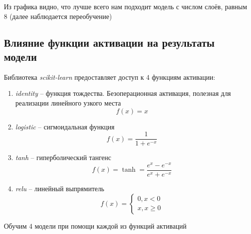 \documentclass[11pt]{article}
\begin{document}
    Из графика видно, что лучше всего нам подходит модель с числом слоёв,
равным 8 (далее наблюдается переобучение)

    \hypertarget{ux432ux43bux438ux44fux43dux438ux435-ux444ux443ux43dux43aux446ux438ux438-ux430ux43aux442ux438ux432ux430ux446ux438ux438-ux43dux430-ux440ux435ux437ux443ux43bux44cux442ux430ux442ux44b-ux43cux43eux434ux435ux43bux438}{%
\subsection{Влияние функции активации на результаты
модели}\label{ux432ux43bux438ux44fux43dux438ux435-ux444ux443ux43dux43aux446ux438ux438-ux430ux43aux442ux438ux432ux430ux446ux438ux438-ux43dux430-ux440ux435ux437ux443ux43bux44cux442ux430ux442ux44b-ux43cux43eux434ux435ux43bux438}}

Библиотека \textit{scikit-learn} предоставляет доступ к 4 функциям
активации:

\begin{enumerate}
    \item \textit{identity} -- функция тождества. Безоперационная активация, полезная для реализации линейного узкого места
        \begin{equation}
            f(x) = x
        \end{equation}
    \item \textit{logistic} -- сигмоидальная функция
        \begin{equation}
            f(x) = \frac{1}{1+e^{-x}}
        \end{equation}
    \item \textit{tanh} -- гиперболический тангенс
        \begin{equation}
            f(x) = \tanh = \frac{e^{x}-e^{-x}}{e^{x}+e^{-x}}
        \end{equation}
    \item \textit{relu} -- линейный выпрямитель
        \begin{equation}
            f(x) = 
            \begin{cases}
                0, x<0\\
                x, x\geqslant 0
            \end{cases}
        \end{equation}
\end{enumerate}

Обучим 4 модели при помощи каждой из функций активаций
\end{document}
